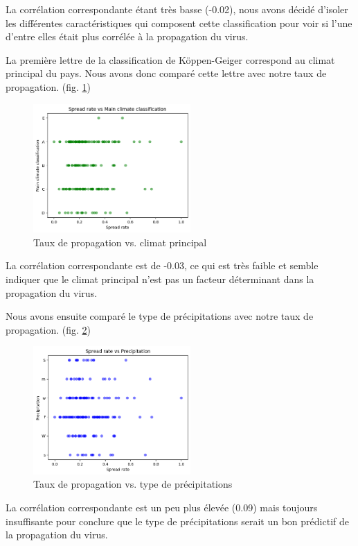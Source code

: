 \documentclass[12pt]{iEEEtran}
\begin{document}
La corrélation correspondante étant très basse (-0.02), nous avons décidé d'isoler les
différentes caractéristiques qui composent cette classification pour voir si l'une d'entre
elles était plus corrélée à la propagation du virus.

La première lettre de la classification de Köppen-Geiger correspond au climat principal
du pays. Nous avons donc comparé cette lettre avec notre taux de propagation. (fig. \ref{fig:spread_main_clim})

\begin{figure}[h]
    \centering
    \includegraphics[width=6cm]{img/spread_main_clim.png}
    \caption{Taux de propagation vs. climat principal}
    \label{fig:spread_main_clim}
\end{figure}

La corrélation correspondante est de -0.03, ce qui est très faible et semble indiquer que le climat
principal n'est pas un facteur déterminant dans la propagation du virus.

Nous avons ensuite comparé le type de précipitations avec notre taux de propagation. (fig. \ref{fig:spread_prec})

\begin{figure}[h]
    \centering
    \includegraphics[width=6cm]{img/spread_prec.png}
    \caption{Taux de propagation vs. type de précipitations}
    \label{fig:spread_prec}
\end{figure}

La corrélation correspondante est un peu plus élevée (0.09) mais toujours insuffisante pour conclure
que le type de précipitations serait un bon prédictif de la propagation du virus.
\end{document}
